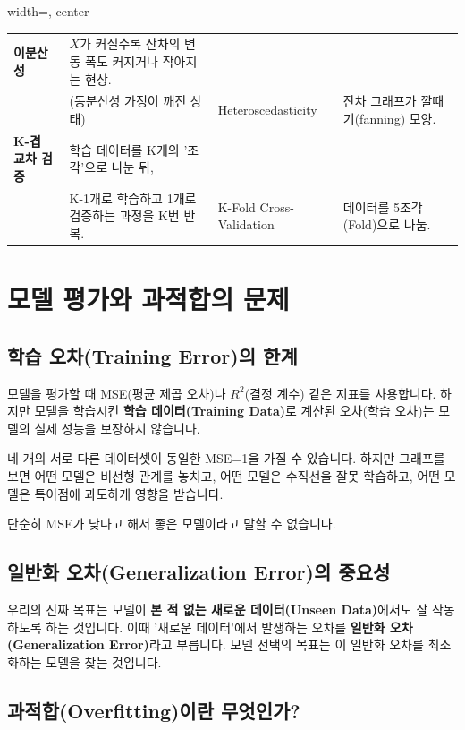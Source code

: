\documentclass[11pt,a4paper]{book}
\theoremstyle{definition}
\begin{document}
\begin{table}[h!]
\begin{adjustbox}{width=\textwidth, center}
\begin{tabular}{@{}llll@{}}
\textbf{이분산성} & $X$가 커질수록 잔차의 변동 폭도 커지거나 작아지는 현상. \\ & (동분산성 가정이 깨진 상태) & Heteroscedasticity & 잔차 그래프가 깔때기(fanning) 모양. \\
\textbf{K-겹 교차 검증} & 학습 데이터를 K개의 '조각'으로 나눈 뒤, \\ & K-1개로 학습하고 1개로 검증하는 과정을 K번 반복. & K-Fold Cross-Validation & 데이터를 5조각(Fold)으로 나눔. \\
\bottomrule
\end{tabular}
\end{adjustbox}
\end{table}


\section{모델 평가와 과적합의 문제}

\subsection{학습 오차(Training Error)의 한계}

모델을 평가할 때 MSE(평균 제곱 오차)나 $R^2$(결정 계수) 같은 지표를 사용합니다. 하지만 모델을 학습시킨 \textbf{학습 데이터(Training Data)}로 계산된 오차(학습 오차)는 모델의 실제 성능을 보장하지 않습니다.

\begin{warningbox}[title=학습 오차는 믿을 수 없다]
네 개의 서로 다른 데이터셋이 동일한 MSE=1을 가질 수 있습니다. 하지만 그래프를 보면 어떤 모델은 비선형 관계를 놓치고, 어떤 모델은 수직선을 잘못 학습하고, 어떤 모델은 특이점에 과도하게 영향을 받습니다.

단순히 MSE가 낮다고 해서 좋은 모델이라고 말할 수 없습니다.
\end{warningbox}

\subsection{일반화 오차(Generalization Error)의 중요성}

우리의 진짜 목표는 모델이 \textbf{본 적 없는 새로운 데이터(Unseen Data)}에서도 잘 작동하도록 하는 것입니다.
이때 '새로운 데이터'에서 발생하는 오차를 \textbf{일반화 오차(Generalization Error)}라고 부릅니다.
모델 선택의 목표는 이 일반화 오차를 최소화하는 모델을 찾는 것입니다.

\subsection{과적합(Overfitting)이란 무엇인가?}
\end{document}
